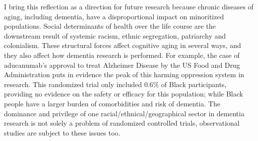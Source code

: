 \documentclass[
]{book}
\begin{document}
I bring this reflection as a direction for future research because chronic diseases of aging, including dementia, have a disproportional impact on minoritized populations\autocite{mayeda2016,nebel2018,weuve2018}. Social determinants of health over the life course are the downstream result of systemic racism, ethnic segregation, patriarchy and colonialism. These structural forces affect cognitive aging in several ways\autocite{glymour_manly2008}, and they also affect how dementia research is performed. For example, the case of aducanumab's approval to treat Alzheimer Disease by the US Food and Drug Administration puts in evidence the peak of this harming oppression system in research. This randomized trial only included 0.6\% of Black participants, providing no evidence on the safety or efficacy for this population; while Black people have a larger burden of comorbidities and risk of dementia\autocite{manly_glymour2021}. The dominance and privilege of one racial/ethnical/geographical sector in dementia research is not solely a problem of randomized controlled trials\autocite{gilmore2021,manly_gilmore2021,raman2021}, observational studies are subject to these issues too\autocite{howe2018,jackson2021}.
\end{document}
